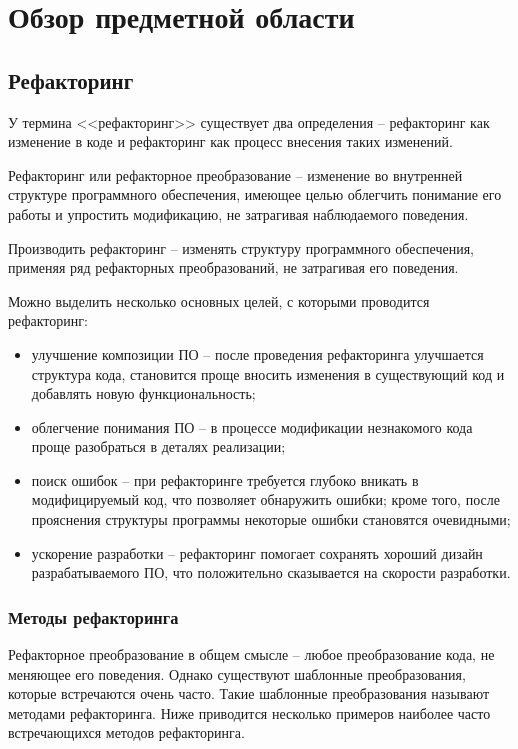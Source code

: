 \chapter{Обзор предметной области}
\section{Рефакторинг}
У термина <<рефакторинг>> существует два определения -- рефакторинг как изменение в коде и рефакторинг как процесс внесения таких изменений.
\begin{definition}
Рефакторинг или рефакторное преобразование -- изменение во внутренней структуре программного обеспечения,
имеющее целью облегчить понимание его работы и упростить модификацию, не затрагивая наблюдаемого поведения.
\end{definition}
\begin{definition}
Производить рефакторинг -- изменять структуру программного обеспечения, применяя
ряд рефакторных преобразований, не затрагивая его поведения.
\end{definition}
Можно выделить несколько основных целей, с которыми проводится рефакторинг:
\begin{itemize}
    \item улучшение композиции ПО -- после проведения рефакторинга улучшается структура кода,
    становится проще вносить изменения в существующий код и добавлять новую функциональность;
    \item облегчение понимания ПО -- в процессе модификации незнакомого кода проще разобраться в деталях реализации;
    \item поиск ошибок -- при рефакторинге требуется глубоко вникать в модифицируемый код, что позволяет обнаружить ошибки;
    кроме того, после прояснения структуры программы некоторые ошибки становятся очевидными;
    \item ускорение разработки -- рефакторинг помогает сохранять хороший дизайн разрабатываемого ПО,
    что положительно сказывается на скорости разработки.
\end{itemize}
\subsection{Методы рефакторинга}
Рефакторное преобразование в общем смысле -- любое преобразование кода, не меняющее его поведения.
Однако существуют шаблонные преобразования, которые встречаются очень часто.
Такие шаблонные преобразования называют методами рефакторинга.
Ниже приводится несколько примеров наиболее часто встречающихся методов рефакторинга.
